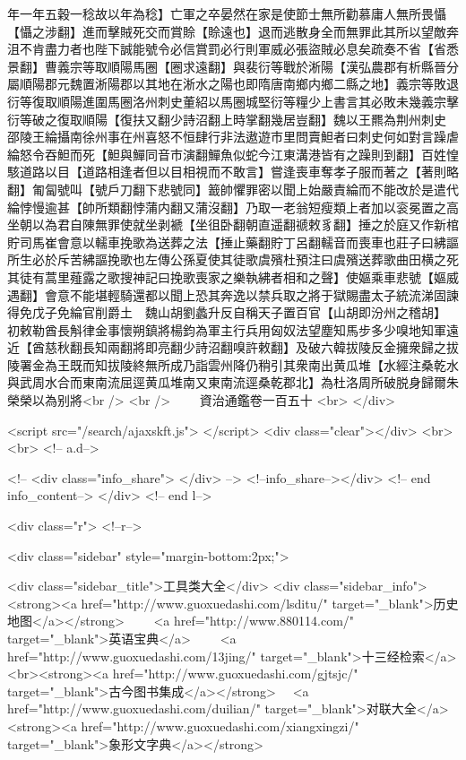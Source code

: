 年一年五穀一稔故以年為稔】亡軍之卒晏然在家是使節士無所勸慕庸人無所畏懾【懾之涉翻】進而擊賊死交而賞賒【賒遠也】退而逃散身全而無罪此其所以望敵奔沮不肯盡力者也陛下誠能號令必信賞罰必行則軍威必張盜賊必息矣疏奏不省【省悉景翻】曹義宗等取順陽馬圈【圈求遠翻】與裴衍等戰於淅陽【漢弘農郡有析縣晉分屬順陽郡元魏置淅陽郡以其地在淅水之陽也即隋唐南鄉内鄉二縣之地】義宗等敗退衍等復取順陽進圍馬圈洛州刺史董紹以馬圈城堅衍等糧少上書言其必敗未幾義宗擊衍等破之復取順陽【復扶又翻少詩沼翻上時掌翻幾居豈翻】魏以王羆為荆州刺史　邵陵王綸攝南徐州事在州喜怒不恒肆行非法遨遊市里問賣䱇者曰刺史何如對言躁虐綸怒令吞䱇而死【䱇與鱓同音市演翻鱓魚似蛇今江東溝港皆有之躁則到翻】百姓惶駭道路以目【道路相逢者但以目相視而不敢言】嘗逢喪車奪孝子服而著之【著則略翻】匍匐號叫【號戶刀翻下悲號同】籖帥懼罪密以聞上始嚴責綸而不能改於是遣代綸悖慢逾甚【帥所類翻悖蒲内翻又蒲沒翻】乃取一老翁短瘦類上者加以衮冕置之高坐朝以為君自陳無罪使就坐剥褫【坐徂卧翻朝直遥翻禠敕豸翻】捶之於庭又作新棺貯司馬崔會意以轜車挽歌為送葬之法【捶止藥翻貯丁呂翻轜音而喪車也莊子曰紼謳所生必於斥苦紼謳挽歌也左傳公孫夏使其徒歌虞殯杜預注曰虞殯送葬歌曲田横之死其徒有蒿里薤露之歌搜神記曰挽歌喪家之樂執紼者相和之聲】使嫗乘車悲號【嫗威遇翻】會意不能堪輕騎還都以聞上恐其奔逸以禁兵取之將于獄賜盡太子統流涕固諫得免戊子免綸官削爵土　魏山胡劉蠡升反自稱天子置百官【山胡即汾州之稽胡】　初敕勒酋長斛律金事懷朔鎮將楊鈞為軍主行兵用匈奴法望塵知馬步多少嗅地知軍遠近【酋慈秋翻長知兩翻將即亮翻少詩沼翻嗅許敕翻】及破六韓拔陵反金擁衆歸之拔陵署金為王既而知拔陵終無所成乃詣雲州降仍稍引其衆南出黄瓜堆【水經注桑乾水與武周水合而東南流屈逕黄瓜堆南又東南流逕桑乾郡北】為杜洛周所破脱身歸爾朱榮榮以為别將<br />
<br />
　　資治通鑑卷一百五十  <br>
   </div> 

<script src="/search/ajaxskft.js"> </script>
 <div class="clear"></div>
<br>
<br>
 <!-- a.d-->

 <!--
<div class="info_share">
</div> 
-->
 <!--info_share--></div>   <!-- end info_content-->
  </div> <!-- end l-->

<div class="r">   <!--r-->



<div class="sidebar"  style="margin-bottom:2px;">

 
<div class="sidebar_title">工具类大全</div>
<div class="sidebar_info">
<strong><a href="http://www.guoxuedashi.com/lsditu/" target="_blank">历史地图</a></strong>　　
<a href="http://www.880114.com/" target="_blank">英语宝典</a>　　
<a href="http://www.guoxuedashi.com/13jing/" target="_blank">十三经检索</a>　
<br><strong><a href="http://www.guoxuedashi.com/gjtsjc/" target="_blank">古今图书集成</a></strong>　
<a href="http://www.guoxuedashi.com/duilian/" target="_blank">对联大全</a>　<strong><a href="http://www.guoxuedashi.com/xiangxingzi/" target="_blank">象形文字典</a></strong>　

